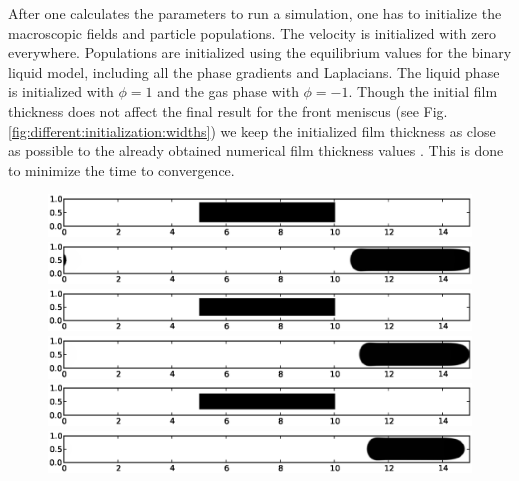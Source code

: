 \documentclass[preprint,12pt]{elsarticle}
\begin{document}
After one calculates the parameters to run a simulation, one has to
initialize the macroscopic fields and particle populations.
The velocity is initialized with zero everywhere. Populations are initialized
using the equilibrium values for the binary liquid model, including all the phase
gradients and Laplacians. The liquid phase is initialized with $\phi = 1$ and the
gas phase with $\phi = -1$. Though the initial film thickness
does not affect the final result for the front meniscus (see Fig.
\ref{fig:different:initialization:widths}) we keep the initialized film
thickness as close as possible to the already obtained numerical film
thickness values \cite{giavedoni-numerical}. This is done to minimize
the time  to convergence. %
\begin{figure}
\includegraphics*[bb=-15 360 630 430,width=\textwidth]
{Figures/Init/initbegin12.eps}
\includegraphics*[bb=-15 360 630
430,width=\textwidth]{Figures/Init/initfinish12.eps}\\
\includegraphics*[bb=-15 360 630 430,
width=\textwidth]{Figures/Init/initbegin16.eps}
\includegraphics*[bb=-15 360 630
430,width=\textwidth]{Figures/Init/initfinish16.eps}\\
\includegraphics*[bb=-15 360 630 430,
width=\textwidth]{Figures/Init/initbegin20.eps}
\includegraphics*[bb=-15 360 630
430,width=\textwidth]{Figures/Init/initfinish20.eps}\\

\end{figure}
\end{document}
